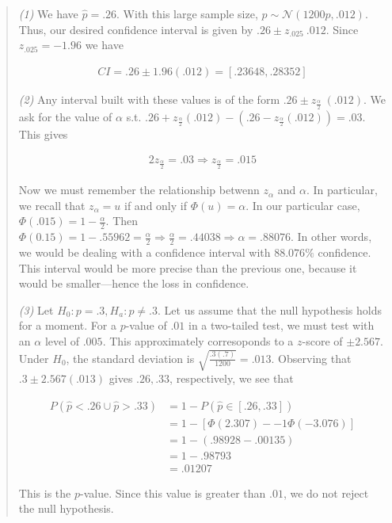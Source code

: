 \documentclass[a4paper, 12pt]{article}
\begin{document}
\small
\begin{quote}

\textit{(1)} We have $\hat{p} = .26$. With this large sample size, $\hat{p} \sim
\mathcal{N}(1200p, .012)$. Thus, our desired confidence interval is given by
$.26 \pm z_{.025} ~ .012$. Since $z_{.025} = -1.96$ we have 

\begin{align*}
    CI = .26 \pm 1.96 (.012) = [.23648, .28352]
\end{align*}

\textit{(2)} Any interval built with these values is of the form $.26 \pm
z_{\frac{\alpha}{2}} ~ (.012)$. We ask for the value of $\alpha$ s.t. $.26 +
z_{\frac{\alpha}{2}}(.012) - (.26 - z_{\frac{\alpha}{2}}(.012)) = .03$. This gives 

\begin{align*}
    2z_{\frac{\alpha}{2}} = .03 \Rightarrow z_{\frac{\alpha}{2}} = .015
\end{align*}

Now we must remember the relationship betwenn $z_{\alpha}$ and $\alpha$. In
particular, we recall that $z_{\alpha} = u$ if and only if $\Phi(u) = \alpha$.
In our particular case, $\Phi(.015) = 1 - \frac{\alpha}{2}$. Then $\Phi(0.15) =
1 - .55962 = \frac{\alpha}{2} \Rightarrow \frac{\alpha}{2} = .44038 \Rightarrow
\alpha=.88076$. In other words, we would be dealing with a confidence interval
with $88.076\%$ confidence. This interval would be more precise than the
previous one, because it would be smaller---hence the loss in confidence. 

\textit{(3)} Let $H_0 : p = .3, H_a : p \neq .3$. Let us assume that the null
hypothesis holds for a moment. For a $p$-value of $.01$ in a two-tailed test, we
must test with an $\alpha$ level of $.005$. This approximately corresoponds to a
$z$-score of $\pm 2.567$. Under $H_0$, the standard deviation is
$\sqrt{\frac{.3(.7)}{1200}} = .013 $. Observing that $.3 \pm 2.567(.013)$ gives
$.26, .33$, respectively, we see that

\begin{align*}
    P(\hat{p} < .26 \cup  \hat{p} > .33) &= 1 - P( \hat{p} \in [.26, .33] ) \\ 
                                         &=1 - [\Phi( 2.307 ) -
                                         -1 \Phi(-3.076)] \\ 
                                         &= 1 - (.98928 - .00135) \\ 
                                         &= 1- .98793 \\ 
                                         &= .01207
\end{align*}

This is the $p$-value. Since this value is greater than $.01$, we do not reject
the null hypothesis.

\end{quote}
\normalsize
\end{document}
